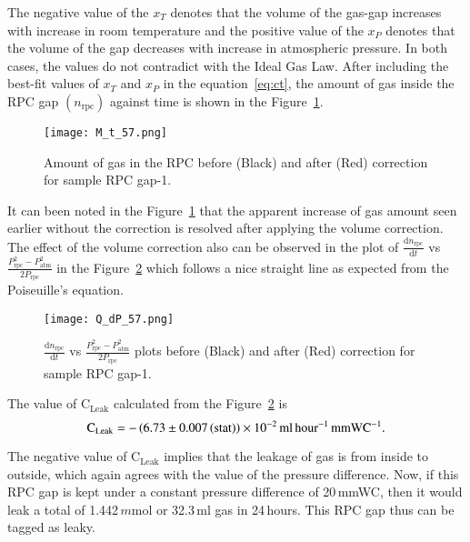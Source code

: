 The negative value of the $x_T$ denotes that the volume of the gas-gap
increases with increase in room temperature and the positive value of the
$x_P$ denotes that the volume of the gap decreases with increase in atmospheric
pressure. In both cases, the values do not contradict with the Ideal Gas Law.
After including the best-fit values of $x_T$ and $x_P$ in the
equation~\ref{eq:ct}, the amount of gas inside the RPC gap
$\left(n_{\textrm{rpc}}\right)$ against time is shown in the Figure~\ref{fig:with}.
\begin{figure}[h]
  \centering
  \texttt{[image: M\_t\_57.png]}
  \caption{Amount of gas in the RPC before (Black) and after (Red) correction
    for sample RPC gap-1.
  }
  \label{fig:with}
\end{figure} 
It can been noted in the Figure~\ref{fig:with} that the apparent increase of
gas amount seen earlier without the correction is resolved after applying the
volume correction. The effect of the volume correction also can be observed in
the plot of $\frac{\mathrm{d}n_{\textrm{rpc}}}{\mathrm{d}t}$ vs
$\frac{P_{\textrm{rpc}}^{2}-P_{\textrm{atm}}^{2}}{2P_{\textrm{rpc}}}$ in the
Figure~\ref{fig:qt} which follows a nice straight line as expected from the
Poiseuille's equation.
\begin{figure}[h]
  \centering
  \texttt{[image: Q\_dP\_57.png]}
  \caption{$\frac{\mathrm{d}n_{\textrm{rpc}}}{\mathrm{d}t}$ vs
    $\frac{P_{\textrm{rpc}}^{2}-P_{\textrm{atm}}^{2}}{2P_{\textrm{rpc}}}$ plots before
    (Black) and after (Red) correction for sample RPC gap-1.}
  \label{fig:qt}
\end{figure}

The value of $\textrm{C}_{\textrm{Leak}}$ calculated from the
Figure~\ref{fig:qt} is
\[\textrm{C}_{\textrm{Leak}}=-\left(6.73\pm 0.007\left(\textrm{stat}\right)\right)\times 10^{-2}\textrm{\,ml\,hour$^{-1}$\,mmWC$^{-1}$}.\]

The negative value of $\textrm{C}_{\textrm{Leak}}$ implies that the leakage of gas
is from inside to outside, which again agrees with the value of the pressure
difference. Now, if this RPC gap is kept under a constant pressure difference
of 20\,mmWC, then it would leak a total of 1.442\,$m$mol or 32.3\,ml gas in
24\,hours. This RPC gap thus can be tagged as leaky.

